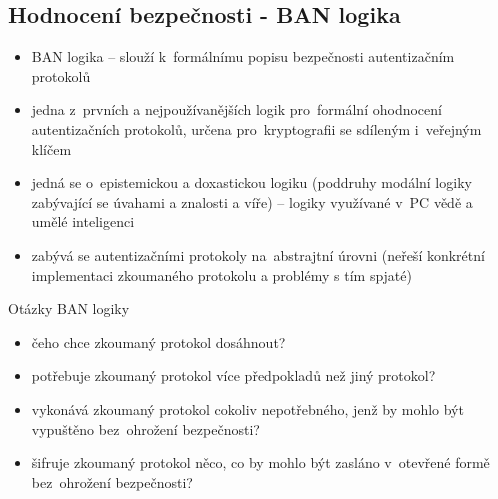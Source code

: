 \subsection{Hodnocení bezpečnosti - BAN logika}
\begin{itemize}
    \item BAN logika -- slouží k~formálnímu popisu bezpečnosti autentizačním protokolů
    \item jedna z~prvních a nejpoužívanějších logik pro~formální ohodnocení autentizačních protokolů, určena pro~kryptografii se sdíleným i~veřejným klíčem
    \item jedná se o~epistemickou a doxastickou logiku (poddruhy modální logiky zabývající se úvahami a znalosti a víře) -- logiky využívané v~PC vědě a umělé inteligenci
    \item zabývá se autentizačními protokoly na~abstrajtní úrovni (neřeší konkrétní implementaci zkoumaného protokolu a problémy s tím spjaté)
\end{itemize}

Otázky BAN logiky
\begin{itemize}
    \item čeho chce zkoumaný protokol dosáhnout?
    \item potřebuje zkoumaný protokol více předpokladů než jiný protokol?
    \item vykonává zkoumaný protokol cokoliv nepotřebného, jenž by mohlo být vypuštěno bez~ohrožení bezpečnosti?
    \item šifruje zkoumaný protokol něco, co by mohlo být zasláno v~otevřené formě bez~ohrožení bezpečnosti? \\
\end{itemize}

